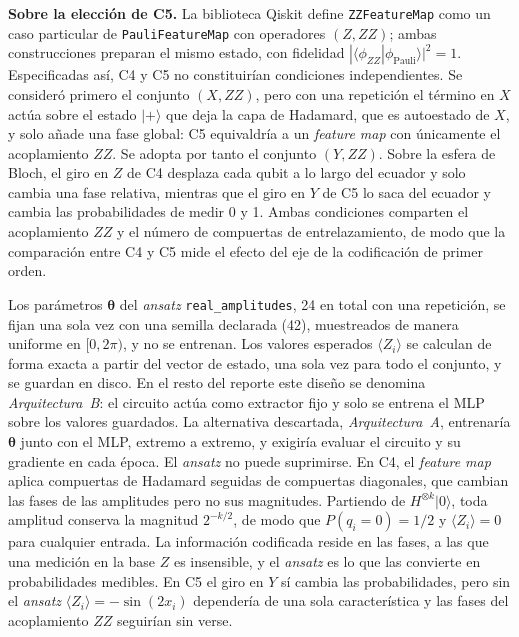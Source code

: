 \textbf{Sobre la elección de C5.} La biblioteca Qiskit define \texttt{ZZFeatureMap} como un
caso particular de \texttt{PauliFeatureMap} con operadores $(Z, ZZ)$; ambas construcciones
preparan el mismo estado, con fidelidad $|\langle\phi_{ZZ}|\phi_{\text{Pauli}}\rangle|^2 = 1$.
Especificadas así, C4 y C5 no constituirían condiciones independientes. Se consideró
primero el conjunto $(X, ZZ)$, pero con una repetición el término en $X$ actúa sobre el
estado $|+\rangle$ que deja la capa de Hadamard, que es autoestado de $X$, y solo añade
una fase global: C5 equivaldría a un \textit{feature map} con únicamente el acoplamiento
$ZZ$. Se adopta por tanto el conjunto $(Y, ZZ)$. Sobre la esfera de Bloch, el giro en
$Z$ de C4 desplaza cada qubit a lo largo del ecuador y solo cambia una fase relativa,
mientras que el giro en $Y$ de C5 lo saca del ecuador y cambia las probabilidades de medir
0 y 1. Ambas condiciones comparten el acoplamiento $ZZ$ y el número de compuertas de
entrelazamiento, de modo que la comparación entre C4 y C5 mide el efecto del eje de la
codificación de primer orden.

Los parámetros $\boldsymbol\theta$ del \textit{ansatz} \texttt{real\_amplitudes}, 24 en total con
una repetición, se fijan una sola vez con una semilla declarada (42), muestreados de manera
uniforme en $[0,2\pi)$, y no se entrenan. Los valores esperados $\langle Z_i\rangle$ se calculan de
forma exacta a partir del vector de estado, una sola vez para todo el conjunto, y se guardan en
disco. En el resto del reporte este diseño se denomina \emph{Arquitectura~B}: el circuito actúa como
extractor fijo y solo se entrena el MLP sobre los valores guardados. La alternativa descartada,
\emph{Arquitectura~A}, entrenaría $\boldsymbol\theta$ junto con el MLP, extremo a extremo, y exigiría
evaluar el circuito y su gradiente en cada época.
El \textit{ansatz} no puede suprimirse. En C4, el \textit{feature map} aplica compuertas de Hadamard
seguidas de compuertas diagonales, que cambian las fases de las amplitudes pero no sus magnitudes.
Partiendo de $H^{\otimes k}|0\rangle$, toda amplitud conserva la magnitud $2^{-k/2}$, de modo que
$P(q_i = 0) = 1/2$ y $\langle Z_i\rangle = 0$ para cualquier entrada. La información codificada
reside en las fases, a las que una medición en la base $Z$ es insensible, y el \textit{ansatz} es lo
que las convierte en probabilidades medibles. En C5 el giro en $Y$ sí cambia las probabilidades, pero
sin el \textit{ansatz} $\langle Z_i\rangle = -\sin(2x_i)$ dependería de una sola característica y las
fases del acoplamiento $ZZ$ seguirían sin verse.


